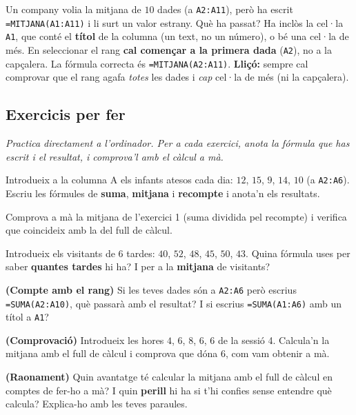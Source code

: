 \begin{exresolt}
Un company volia la mitjana de $10$ dades (a \texttt{A2:A11}), però ha escrit
\texttt{=MITJANA(A1:A11)} i li surt un valor estrany. Què ha passat?
\solucio
Ha inclòs la cel·la \texttt{A1}, que conté el \textbf{títol} de la columna (un text,
no un número), o bé una cel·la de més. En seleccionar el rang \textbf{cal començar a
la primera dada} (\texttt{A2}), no a la capçalera. La fórmula correcta és
\texttt{=MITJANA(A2:A11)}. \textbf{Lliçó:} sempre cal comprovar que el rang agafa
\emph{totes} les dades i \emph{cap} cel·la de més (ni la capçalera).
\end{exresolt}

\subsection{Exercicis per fer}

\noindent\textit{Practica directament a l'ordinador. Per a cada exercici, anota la
fórmula que has escrit i el resultat, i comprova'l amb el càlcul a mà.}

\begin{exercicis}
\begin{exlist}
  \item Introdueix a la columna A els infants atesos cada dia: $12$, $15$, $9$, $14$,
        $10$ (a \texttt{A2:A6}). Escriu les fórmules de \textbf{suma}, \textbf{mitjana}
        i \textbf{recompte} i anota'n els resultats.
  \item Comprova a mà la mitjana de l'exercici 1 (suma dividida pel recompte) i
        verifica que coincideix amb la del full de càlcul.
  \item Introdueix els visitants de $6$ tardes: $40$, $52$, $48$, $45$, $50$, $43$.
        Quina fórmula uses per saber \textbf{quantes tardes} hi ha? I per a la
        \textbf{mitjana} de visitants?
  \item \textbf{(Compte amb el rang)} Si les teves dades són a \texttt{A2:A6} però
        escrius \texttt{=SUMA(A2:A10)}, què passarà amb el resultat? I si escrius
        \texttt{=SUMA(A1:A6)} amb un títol a \texttt{A1}?
  \item \textbf{(Comprovació)} Introdueix les hores $4$, $6$, $8$, $6$, $6$ de la
        sessió 4. Calcula'n la mitjana amb el full de càlcul i comprova que dóna $6$,
        com vam obtenir a mà.
  \item \textbf{(Raonament)} Quin avantatge té calcular la mitjana amb el full de
        càlcul en comptes de fer-ho a mà? I quin \textbf{perill} hi ha si t'hi
        confies sense entendre què calcula? Explica-ho amb les teves paraules.
\end{exlist}
\end{exercicis}


